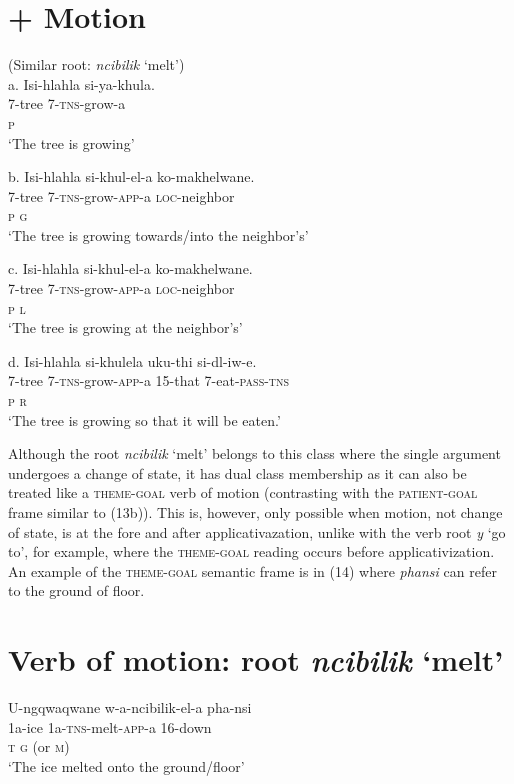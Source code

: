 \chapter[  + Motion]{  + Motion}
       (Similar root: \textit{ncibilik} ‘melt’)\\
\gll     a.  Isi-hlahla    si-ya-khula. \\
           7-tree          7-\textsc{tns}{}-grow-a \\
           \textsc{ p}\\
\glt       ‘The tree is growing’
\z

\gll     b.  Isi-hlahla    si-khul-el-a        ko-makhelwane. \\
           7-tree          7-\textsc{tns}{}-grow-\textsc{app}{}-a     \textsc{loc}{}-neighbor \\
           \textsc{p                  g}\\
\glt       ‘The tree is growing towards/into the neighbor’s’
\z

\gll     c.  Isi-hlahla    si-khul-el-a        ko-makhelwane. \\
           7-tree          7-\textsc{tns}{}-grow-\textsc{app}{}-a  \textsc{loc}{}-neighbor \\
           \textsc{p                  l}\\
\glt       ‘The tree is growing at the neighbor’s’  
\z

\gll     d.  Isi-hlahla    si-khulela        uku-thi   si-dl-iw-e.\\
           7-tree          7-\textsc{tns}{}-grow-\textsc{app}{}-a  15-that     7-eat-\textsc{pass-tns}\\
           \textsc{p                  r}\\
\glt       ‘The tree is growing so that it will be eaten.’  
\z

Although the root \textit{ncibilik} ‘melt’ belongs to this class where the single argument undergoes a change of state, it has dual class membership as it can also be treated like a \textsc{theme-goal} verb of motion (contrasting with the \textsc{patient-goal} frame similar to (13b)). This is, however, only possible when motion, not change of state, is at the fore and after applicativazation, unlike with the verb root \textit{y }‘go to’, for example, where the \textsc{theme-goal} reading occurs before applicativization. An example of the \textsc{theme-goal} semantic frame is in (14) where \textit{phansi} can refer to the ground of floor. 

\chapter[Verb of motion: root ncibilik ‘melt’]{Verb of motion: root \textit{ncibilik} ‘melt’}
\gll   U-ngqwaqwane   w-a-ncibilik-el-a     pha-nsi\\
       1a-ice              1a-\textsc{tns}{}-melt-\textsc{app}{}-a     16-down \\
        \textsc{t                      g} (or \textsc{m})\\
\glt   ‘The ice melted onto the ground/floor’
\z

